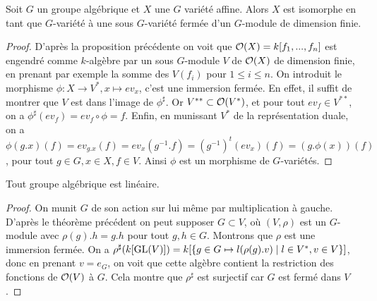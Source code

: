 \begin{thm}\label{embed}
Soit $G$ un groupe algébrique et $X$ une $G$ variété affine. Alors $X$ est isomorphe en tant que $G$-variété à une sous $G$-variété fermée d'un $G$-module de dimension finie.
\end{thm}
\begin{proof}
D'après la proposition précédente on voit que $\mathcal{O}(X)=k[f_1,...,f_n]$ est engendré comme $k$-algèbre par un sous $G$-module $V$ de $\mathcal{O}(X)$ de dimension finie, en prenant par exemple la somme des $V(f_i)$ pour $1\leq i\leq n$. On introduit le morphisme $\phi:X\rightarrow V^*, x\mapsto ev_x$, c'est une immersion fermée. En effet, il suffit de montrer que $V$ est dans l'image de $\phi^\sharp$. Or $V^{**}\subset \mathcal{O}(V^*)$, et pour tout $ev_f\in V^{**}$, on a $\phi^\sharp(ev_f)=ev_f\circ\phi=f$. Enfin, en munissant $V^*$ de la représentation duale, on a $\phi(g.x)(f)=ev_{g.x}(f)=ev_x( g^{-1}.f)=(g^{-1})^t(ev_x)(f)=(g.\phi(x))(f)$, pour tout $g\in G, x\in X,f\in V$. Ainsi $\phi$ est un morphisme de $G$-variétés.
\end{proof}

\begin{cor}
Tout groupe algébrique est linéaire.
\end{cor}
\begin{proof}
On munit $G$ de son action sur lui même par multiplication à gauche. D'après le théorème précédent on peut supposer $G\subset V$, où $(V,\rho)$ est un $G$-module avec $\rho(g).h=g.h$ pour tout $g,h\in G$. Montrons que $\rho$ est une immersion fermée. On a $\rho^\sharp(k[\operatorname{GL}(V)])=k[\lbrace g\in G\mapsto l(\rho(g).v)\mid l\in V^*,v\in V\rbrace]$, donc en prenant $v=e_G$, on voit que cette algèbre contient la restriction des fonctions de $\mathcal{O}(V)$ à $G$. Cela montre que $\rho^\sharp$ est surjectif car $G$ est fermé dans $V$.
\end{proof}

